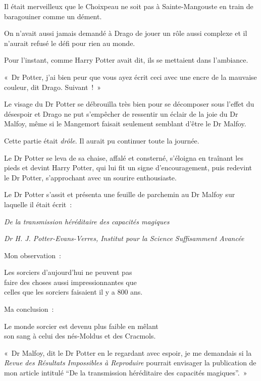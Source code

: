 Il était merveilleux que le Choixpeau ne soit pas à Sainte-Mangouste en train de baragouiner comme un dément.

On n'avait aussi jamais demandé à Drago de jouer un rôle aussi complexe et il n'aurait refusé le défi pour rien au monde.

Pour l'instant, comme Harry Potter avait dit, ils se mettaient dans l'ambiance.

«~Dr Potter, j'ai bien peur que vous ayez écrit ceci avec une encre de la mauvaise couleur, dit Drago. Suivant~!~»

Le visage du Dr Potter se débrouilla très bien pour se décomposer sous l'effet du désespoir et Drago ne put s'empêcher de ressentir un éclair de la joie du Dr Malfoy, même si le Mangemort faisait seulement semblant d'être le Dr Malfoy.

Cette partie était \emph{drôle}. Il aurait pu continuer toute la journée.

Le Dr Potter se leva de sa chaise, affalé et consterné, s'éloigna en traînant les pieds et devint Harry Potter, qui lui fit un signe d'encouragement, puis redevint le Dr Potter, s'approchant avec un sourire enthousiaste.

Le Dr Potter s'assit et présenta une feuille de parchemin au Dr Malfoy sur laquelle il était écrit~:
\begin{center}
\emph{De la transmission héréditaire des capacités magiques}

\emph{Dr H. J. Potter-Evans-Verres, Institut pour la Science Suffisamment Avancée} \end{center}

\begin{writtenNote}
Mon observation~:

Les sorciers d'aujourd'hui ne peuvent pas\\
faire des choses aussi impressionnantes que\\
celles que les sorciers faisaient il y a 800 ans.

Ma conclusion~:

Le monde sorcier est devenu plus faible en mêlant\\
son sang à celui des nés-Moldus et des Cracmols.
\end{writtenNote}

«~Dr Malfoy, dit le Dr Potter en le regardant avec espoir, je me demandais si la \emph{Revue des Résultats Impossibles à Reproduire} pourrait envisager la publication de mon article intitulé “De la transmission héréditaire des capacités magiques”.~»

